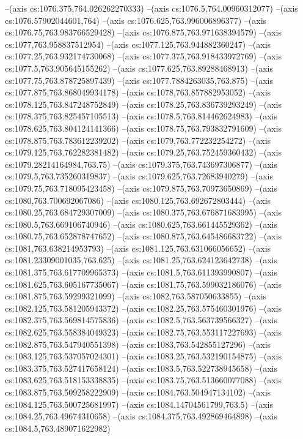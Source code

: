 --(axis cs:1076.375,764.026262270333)
--(axis cs:1076.5,764.00960312077)
--(axis cs:1076.57902044601,764)
--(axis cs:1076.625,763.996006896377)
--(axis cs:1076.75,763.983766529428)
--(axis cs:1076.875,763.971638394579)
--(axis cs:1077,763.958837512954)
--(axis cs:1077.125,763.944882360247)
--(axis cs:1077.25,763.932174730068)
--(axis cs:1077.375,763.918433972769)
--(axis cs:1077.5,763.905645155262)
--(axis cs:1077.625,763.89288468913)
--(axis cs:1077.75,763.878725897439)
--(axis cs:1077.7884263035,763.875)
--(axis cs:1077.875,763.868049934178)
--(axis cs:1078,763.857882953052)
--(axis cs:1078.125,763.847248752849)
--(axis cs:1078.25,763.836739293249)
--(axis cs:1078.375,763.825457105513)
--(axis cs:1078.5,763.814462624983)
--(axis cs:1078.625,763.804124141366)
--(axis cs:1078.75,763.793832791609)
--(axis cs:1078.875,763.783612239202)
--(axis cs:1079,763.772232254272)
--(axis cs:1079.125,763.762282381482)
--(axis cs:1079.25,763.752459360432)
--(axis cs:1079.28214164984,763.75)
--(axis cs:1079.375,763.743697306877)
--(axis cs:1079.5,763.735260319837)
--(axis cs:1079.625,763.72683940279)
--(axis cs:1079.75,763.718095423458)
--(axis cs:1079.875,763.70973650869)
--(axis cs:1080,763.700692067086)
--(axis cs:1080.125,763.692672803444)
--(axis cs:1080.25,763.684729307009)
--(axis cs:1080.375,763.676871683995)
--(axis cs:1080.5,763.669106740946)
--(axis cs:1080.625,763.661445529362)
--(axis cs:1080.75,763.652878747652)
--(axis cs:1080.875,763.645486683722)
--(axis cs:1081,763.638214953793)
--(axis cs:1081.125,763.631066056652)
--(axis cs:1081.23309001035,763.625)
--(axis cs:1081.25,763.624123642738)
--(axis cs:1081.375,763.617709965373)
--(axis cs:1081.5,763.611393990807)
--(axis cs:1081.625,763.605167735067)
--(axis cs:1081.75,763.599032186076)
--(axis cs:1081.875,763.59299321099)
--(axis cs:1082,763.587050633855)
--(axis cs:1082.125,763.581205943372)
--(axis cs:1082.25,763.575460301976)
--(axis cs:1082.375,763.569814575836)
--(axis cs:1082.5,763.563739566327)
--(axis cs:1082.625,763.558384049323)
--(axis cs:1082.75,763.553117227693)
--(axis cs:1082.875,763.547940551398)
--(axis cs:1083,763.542855127296)
--(axis cs:1083.125,763.537057024301)
--(axis cs:1083.25,763.532190154875)
--(axis cs:1083.375,763.527417658124)
--(axis cs:1083.5,763.522738945658)
--(axis cs:1083.625,763.518153338835)
--(axis cs:1083.75,763.513660077088)
--(axis cs:1083.875,763.509258222909)
--(axis cs:1084,763.504947134102)
--(axis cs:1084.125,763.500725681997)
--(axis cs:1084.14704561799,763.5)
--(axis cs:1084.25,763.49674310658)
--(axis cs:1084.375,763.492869464898)
--(axis cs:1084.5,763.489071622982)
